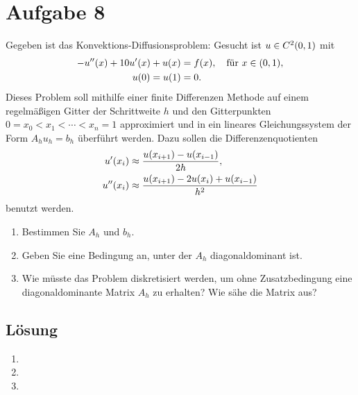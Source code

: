 \documentclass{exercise}
\begin{document}
    \section*{Aufgabe 8}

    \begin{problem}
        Gegeben ist das Konvektions-Diffusionsproblem: Gesucht ist \(u \in C^2\parentheses*{0, 1}\) mit
        \begin{align*}
            -u''\parentheses*{x} + 10u'\parentheses*{x} + u\parentheses*{x} &= f\parentheses*{x}, \quad \text{für }x \in \parentheses*{0, 1},\\
            u\parentheses*{0} = u\parentheses*{1} &= 0.
        \end{align*}
        Dieses Problem soll mithilfe einer finite Differenzen Methode auf einem regelmäßigen Gitter der Schrittweite \(h\) und den Gitterpunkten \(0 = x_0 < x_1 < \cdots < x_n = 1\) approximiert und in ein lineares Gleichungssystem der Form \(A_h u_h = b_h\) überführt werden.
        Dazu sollen die Differenzenquotienten
        \begin{align*}
            u'\parentheses*{x_i} &\approx \frac{u\parentheses*{x_{i + 1}} - u\parentheses*{x_{i - 1}}}{2h},\\
            u''\parentheses*{x_i} &\approx \frac{u\parentheses*{x_{i + 1}} - 2u\parentheses*{x_i} + u\parentheses*{x_{i - 1}}}{h^2}
        \end{align*}
        benutzt werden.
        \begin{enumerate}
            \item Bestimmen Sie \(A_h\) und \(b_h\).
            \item Geben Sie eine Bedingung an, unter der \(A_h\) diagonaldominant ist.
            \item Wie müsste das Problem diskretisiert werden, um ohne Zusatzbedingung eine diagonaldominante Matrix \(A_h\) zu erhalten?
            Wie sähe die Matrix aus?
        \end{enumerate}
    \end{problem}

    \subsection*{Lösung}
    \begin{enumerate}
        \item
        \item
        \item
    \end{enumerate}
\end{document}
